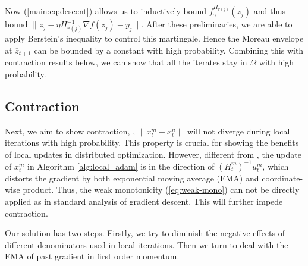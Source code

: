 \documentclass{article} %
\numberwithin{equation}{section}
\renewcommand{\eqref}[1]{(\ref{#1})}
\begin{document}
    Now \eqref{main:eq:descent} allows us to inductively bound $f_\gamma^{H_{r(j)}}(\overline{z}_{j})$ and thus bound $\|\overline{z}_{j}-\eta H_{r(j)}^{-1}\nabla f(\overline{z}_j)-y_j\|$.
    After these preliminaries, we are able to apply Berstein's inequality \citep{bennett1962probability, freedman1975tail} to control this martingale.
    Hence the Moreau envelope at $\overline{z}_{t+1}$ can be bounded by a constant with high probability.
    Combining this with contraction results below, we can show that all the iterates stay in $\Omega$ with high probability.

\subsection{Contraction}
    Next, we aim to show contraction, \ie, $\|x_t^m-x_t^n\|$ will not diverge during local iterations with high probability. 
    This property is crucial for showing the benefits of local updates in distributed optimization. 
    However, different from \cite{woodworth2020local,khaled2020tighter}, the update of $x_t^m$ in Algorithm \ref{alg:local_adam} is in the direction of $(H_t^m)^{-1}u_t^m$, which distorts the gradient by both exponential moving average (EMA) and coordinate-wise product. 
    Thus, the weak monotonicity \eqref{eq:weak-mono} can not be directly applied as in standard analysis of gradient descent.
    This will further impede contraction.

    Our solution has two steps. Firstly, we try to diminish the negative effects of different denominators used in local iterations. Then we turn to deal with the EMA of past gradient in first order momentum.
\end{document}
